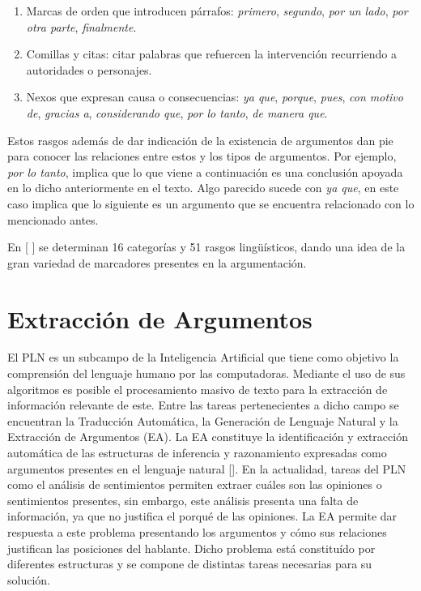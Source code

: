\begin{enumerate}
    \item Marcas de orden que introducen párrafos: \emph{primero}, \emph{segundo}, \emph{por un lado}, 
    \emph{por otra parte}, \emph{finalmente}.
    \item Comillas y citas: citar palabras que refuercen la intervención recurriendo a autoridades
    o personajes.
    \item Nexos que expresan causa o consecuencias: \emph{ya que}, \emph{porque}, \emph{pues}, 
    \emph{con motivo de}, \emph{gracias a}, \emph{considerando que}, \emph{por lo tanto}, \emph{de manera que}.
\end{enumerate}

Estos rasgos además de dar indicación de la existencia de argumentos dan pie para conocer las relaciones
entre estos y los tipos de argumentos. Por ejemplo, \emph{por lo tanto}, implica que lo que viene 
a continuación es una conclusión apoyada en lo dicho anteriormente en el texto. Algo parecido
sucede con \emph{ya que}, en este caso implica que lo siguiente es un argumento que se encuentra 
relacionado con lo mencionado antes.

En [
\cite{venegas2005hacia}
] se determinan 16 categorías y 51 rasgos lingüísticos, dando una idea 
de la gran variedad de marcadores presentes en la argumentación.

\section{Extracción de Argumentos}

El PLN es un subcampo de la Inteligencia Artificial que tiene como objetivo la comprensión 
del lenguaje humano por las computadoras. 
Mediante el uso de sus algoritmos es posible el procesamiento masivo de texto para la extracción de información 
relevante de este. Entre las tareas pertenecientes a dicho campo se encuentran la Traducción Automática, 
la Generación de Lenguaje Natural y la Extracción de Argumentos (EA). La EA constituye la identificación y extracción 
automática de las estructuras de inferencia y 
razonamiento expresadas como argumentos presentes en el lenguaje natural [\cite{lawrence2020argument}].
En la actualidad, tareas del PLN como el análisis de sentimientos permiten 
extraer cuáles son las opiniones o sentimientos presentes, sin embargo, este análisis presenta una falta 
de información, ya que no justifica el porqué de las opiniones. La EA permite dar respuesta a este problema presentando
los argumentos y cómo sus relaciones justifican las posiciones del hablante. Dicho problema está constituído por diferentes 
estructuras y se compone de distintas tareas necesarias para su solución.

